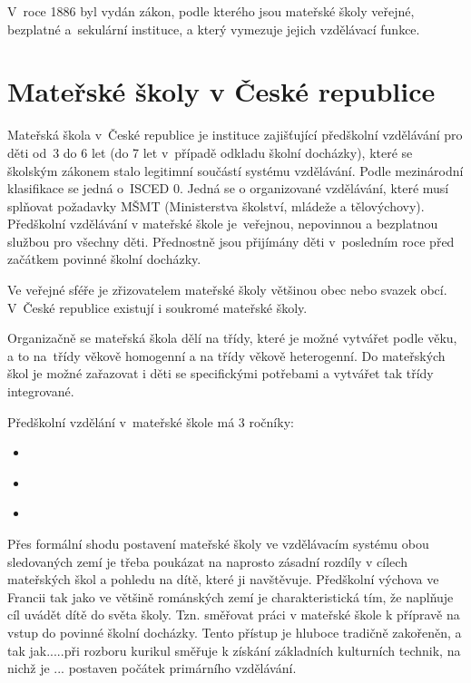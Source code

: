 		V roce 1886 byl vydán zákon, podle kterého jsou mateřské školy veřejné, bezplatné a sekulární instituce, a který vymezuje jejich vzdělávací funkce.

	\section{Mateřské školy v České republice}
		Mateřská škola v České republice je instituce zajišťující předškolní vzdělávání pro děti od 3 do 6 let (do 7 let v případě odkladu školní docházky), které se školským zákonem stalo legitimní součástí systému vzdělávání. Podle mezinárodní klasifikace se jedná o ISCED 0. Jedná se o organizované vzdělávání, které musí splňovat požadavky MŠMT (Ministerstva školství, mládeže a tělovýchovy). Předškolní vzdělávání v mateřské škole je veřejnou, nepovinnou a bezplatnou službou pro všechny děti. Přednostně jsou přijímány děti v posledním roce před začátkem povinné školní docházky. 

		Ve veřejné sféře je zřizovatelem mateřské školy většinou obec nebo svazek obcí. V České republice existují i soukromé mateřské školy.

		Organizačně se mateřská škola dělí na třídy, které je možné vytvářet podle věku, a to na třídy věkově homogenní a na třídy věkově heterogenní. Do mateřských škol je možné zařazovat i děti se specifickými potřebami a vytvářet tak třídy integrované. 

		
		Předškolní vzdělání v mateřské škole má 3 ročníky:
		
	\begin{itemize}
		\setlength\itemsep{-2mm}
		\item [] \textit{}
		\item [] \textit{}
		\item [] \textit {} \citep[s.~71]{Organizace}
	\end{itemize}

Přes formální shodu postavení mateřské školy ve vzdělávacím systému obou sledovaných zemí je třeba poukázat na naprosto zásadní rozdíly v cílech mateřských škol a pohledu na dítě, které ji navštěvuje.
Předškolní výchova ve Francii tak jako ve většině románských zemí je charakteristická tím, že naplňuje cíl uvádět dítě do světa školy. Tzn. směřovat práci v mateřské škole k přípravě na vstup do povinné školní docházky. Tento přístup je hluboce tradičně zakořeněn, a tak jak.....při rozboru kurikul směřuje k získání základních kulturních technik, na nichž je ... postaven počátek primárního vzdělávání. 

